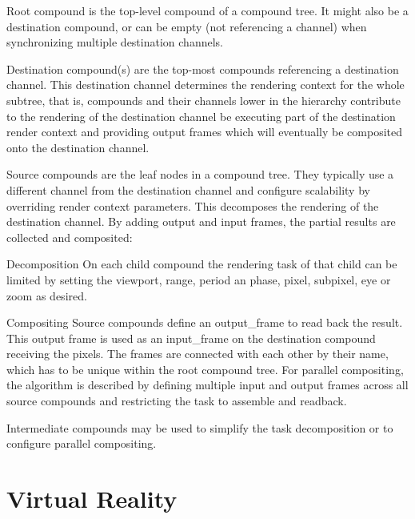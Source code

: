 \begin{compactdesc}
 \item [Root compound] is the top-level compound of a compound tree. It might
 also be a destination compound, or can be empty (not referencing a channel)
 when synchronizing multiple destination channels.
 \item [Destination compound(s)] are the top-most compounds referencing a
 destination channel. This destination channel determines the rendering context
 for the whole subtree, that is, compounds and their channels lower in the
 hierarchy contribute to the rendering of the destination channel be executing
 part of the destination render context and providing output frames which will
 eventually be composited onto the destination channel.
 \item [Source compounds] are the leaf nodes in a compound tree. They typically
 use a different channel from the destination channel and configure scalability
 by overriding render context parameters. This decomposes the rendering of the
 destination channel. By adding output and input frames, the partial results are
 collected and composited:
 \begin{compactdesc}
  \item[Decomposition] On each child compound the rendering task of that
  child can be limited by setting the \textsf{viewport}, \textsf{range},
  \textsf{period} an  \textsf{phase}, \textsf{pixel}, \textsf{subpixel},
  \textsf{eye} or \textsf{zoom} as desired.

  \item[Compositing] Source compounds define an \textsf{output\_frame} to read
  back the result. This output frame is used as an \textsf{input\_frame} on the
  destination compound receiving the pixels. The frames are connected with each
  other by their name, which has to be unique within the root compound tree.
  For parallel compositing, the algorithm is described by defining multiple
  input and output frames across all source compounds and restricting the task
  to assemble and readback.

 \end{compactdesc}
 \item[Intermediate compounds] may be used to simplify the task decomposition or
 to configure parallel compositing.
\end{compactdesc}

\section{Virtual Reality}

